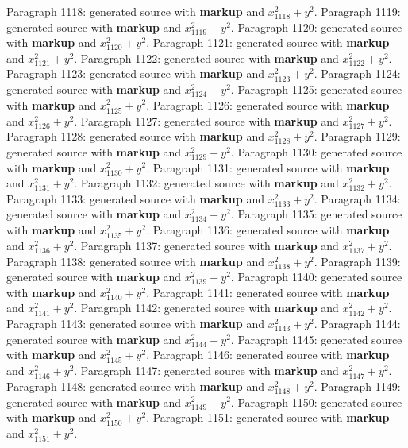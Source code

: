 \documentclass{article}
\begin{document}
Paragraph 1118: generated source with \textbf{markup} and $x_{1118}^2 + y^2$.
Paragraph 1119: generated source with \textbf{markup} and $x_{1119}^2 + y^2$.
Paragraph 1120: generated source with \textbf{markup} and $x_{1120}^2 + y^2$.
Paragraph 1121: generated source with \textbf{markup} and $x_{1121}^2 + y^2$.
Paragraph 1122: generated source with \textbf{markup} and $x_{1122}^2 + y^2$.
Paragraph 1123: generated source with \textbf{markup} and $x_{1123}^2 + y^2$.
Paragraph 1124: generated source with \textbf{markup} and $x_{1124}^2 + y^2$.
Paragraph 1125: generated source with \textbf{markup} and $x_{1125}^2 + y^2$.
Paragraph 1126: generated source with \textbf{markup} and $x_{1126}^2 + y^2$.
Paragraph 1127: generated source with \textbf{markup} and $x_{1127}^2 + y^2$.
Paragraph 1128: generated source with \textbf{markup} and $x_{1128}^2 + y^2$.
Paragraph 1129: generated source with \textbf{markup} and $x_{1129}^2 + y^2$.
Paragraph 1130: generated source with \textbf{markup} and $x_{1130}^2 + y^2$.
Paragraph 1131: generated source with \textbf{markup} and $x_{1131}^2 + y^2$.
Paragraph 1132: generated source with \textbf{markup} and $x_{1132}^2 + y^2$.
Paragraph 1133: generated source with \textbf{markup} and $x_{1133}^2 + y^2$.
Paragraph 1134: generated source with \textbf{markup} and $x_{1134}^2 + y^2$.
Paragraph 1135: generated source with \textbf{markup} and $x_{1135}^2 + y^2$.
Paragraph 1136: generated source with \textbf{markup} and $x_{1136}^2 + y^2$.
Paragraph 1137: generated source with \textbf{markup} and $x_{1137}^2 + y^2$.
Paragraph 1138: generated source with \textbf{markup} and $x_{1138}^2 + y^2$.
Paragraph 1139: generated source with \textbf{markup} and $x_{1139}^2 + y^2$.
Paragraph 1140: generated source with \textbf{markup} and $x_{1140}^2 + y^2$.
Paragraph 1141: generated source with \textbf{markup} and $x_{1141}^2 + y^2$.
Paragraph 1142: generated source with \textbf{markup} and $x_{1142}^2 + y^2$.
Paragraph 1143: generated source with \textbf{markup} and $x_{1143}^2 + y^2$.
Paragraph 1144: generated source with \textbf{markup} and $x_{1144}^2 + y^2$.
Paragraph 1145: generated source with \textbf{markup} and $x_{1145}^2 + y^2$.
Paragraph 1146: generated source with \textbf{markup} and $x_{1146}^2 + y^2$.
Paragraph 1147: generated source with \textbf{markup} and $x_{1147}^2 + y^2$.
Paragraph 1148: generated source with \textbf{markup} and $x_{1148}^2 + y^2$.
Paragraph 1149: generated source with \textbf{markup} and $x_{1149}^2 + y^2$.
Paragraph 1150: generated source with \textbf{markup} and $x_{1150}^2 + y^2$.
Paragraph 1151: generated source with \textbf{markup} and $x_{1151}^2 + y^2$.
\end{document}
